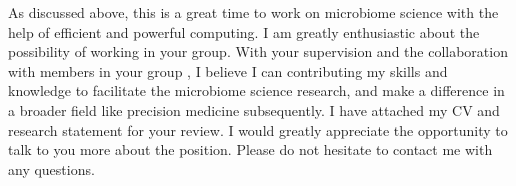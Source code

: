 \documentclass[10pt,a4paper,sans]{moderncv}        %
\begin{document}
As discussed above, this is a great time to work on microbiome science with the help of efficient 
and powerful computing. I am greatly enthusiastic about the possibility of working in your group. 
With your supervision and the collaboration with members in your group , I believe I can 
contributing my skills and knowledge to facilitate the microbiome science research, and make a 
difference in a broader field like precision medicine subsequently. I have attached my CV and 
research statement for your review. I would greatly appreciate the opportunity to talk to you 
more about the position. Please do not hesitate to contact me with any questions.



\makeletterclosing
\end{document}
